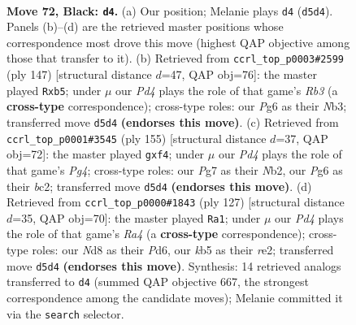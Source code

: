 \documentclass[11pt]{article}
\begin{document}
\clearpage

\begin{figure}[p]\centering
\begin{subfigure}{0.46\textwidth}\centering
\resizebox{\linewidth}{!}{%
\newchessgame
\chessboard[
  setfen={3n4/2k3p1/1p4p1/pKpp4/2P5/1P6/8/8 b - - 0 72},
  showmover=false,
  pgfstyle=straightmove, color=movearrow, markmove={d5-d4}
]}
\caption{}
\end{subfigure}\hfill
\begin{subfigure}{0.46\textwidth}\centering
\resizebox{\linewidth}{!}{%
\newchessgame
\chessboard[
  setfen={R7/8/1r2pk2/1P4p1/6Kp/1n1N3P/6P1/8 b - - 4 74},
  showmover=false,
  pgfstyle=straightmove, color=movearrow, markmove={b6-b5}
]}
\caption{}
\end{subfigure}
\\[4pt]
\begin{subfigure}{0.46\textwidth}\centering
\resizebox{\linewidth}{!}{%
\newchessgame
\chessboard[
  setfen={8/6k1/5p2/4p1pK/5PP1/4P3/1nB5/8 b - - 0 78},
  showmover=false,
  pgfstyle=straightmove, color=movearrow, markmove={g5-f4}
]}
\caption{}
\end{subfigure}\hfill
\begin{subfigure}{0.46\textwidth}\centering
\resizebox{\linewidth}{!}{%
\newchessgame
\chessboard[
  setfen={8/5k2/3p1p2/r4P2/3pK1PP/4p3/4R3/8 b - - 1 64},
  showmover=false,
  pgfstyle=straightmove, color=movearrow, markmove={a5-a1}
]}
\caption{}
\end{subfigure}
\caption{\textbf{Move 72, Black: \texttt{d4}.} (a) Our position; Melanie plays \texttt{d4} (\texttt{d5d4}). Panels (b)--(d) are the retrieved master positions whose correspondence most drove this move (highest QAP objective among those that transfer to it). (b) Retrieved from \texttt{ccrl\_top\_p0003\#2599} (ply 147) [structural distance $d$=47, QAP obj=76]: the master played \texttt{Rxb5}; under $\mu$ our \emph{Pd4} plays the role of that game's \emph{Rb3} (a \textbf{cross-type} correspondence); cross-type roles: our \emph{P}g6 as their \emph{N}b3; transferred move \texttt{d5d4} \textbf{(endorses this move)}. (c) Retrieved from \texttt{ccrl\_top\_p0001\#3545} (ply 155) [structural distance $d$=37, QAP obj=72]: the master played \texttt{gxf4}; under $\mu$ our \emph{Pd4} plays the role of that game's \emph{Pg4}; cross-type roles: our \emph{P}g7 as their \emph{N}b2, our \emph{P}g6 as their \emph{b}c2; transferred move \texttt{d5d4} \textbf{(endorses this move)}. (d) Retrieved from \texttt{ccrl\_top\_p0000\#1843} (ply 127) [structural distance $d$=35, QAP obj=70]: the master played \texttt{Ra1}; under $\mu$ our \emph{Pd4} plays the role of that game's \emph{Ra4} (a \textbf{cross-type} correspondence); cross-type roles: our \emph{N}d8 as their \emph{P}d6, our \emph{k}b5 as their \emph{r}e2; transferred move \texttt{d5d4} \textbf{(endorses this move)}. Synthesis: 14 retrieved analogs transferred to \texttt{d4} (summed QAP objective 667, the strongest correspondence among the candidate moves); Melanie committed it via the \texttt{search} selector.}
\label{fig:thought-m143}
\end{figure}
\end{document}

